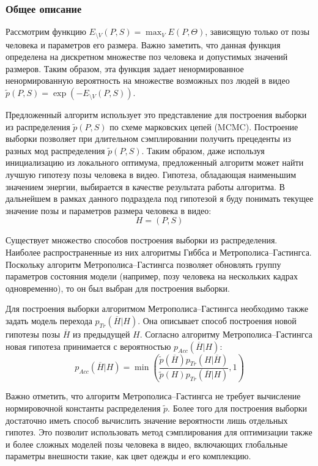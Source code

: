 \subsubsection{Общее описание}

Рассмотрим функцию $E_{\setminus V}(P, S) = \max_V{E(P, \Theta)}$, зависящую только от позы человека и параметров его размера. Важно заметить, что данная функция определена на дискретном множестве поз человека и допустимых значений размеров. Таким образом, эта функция задает ненормированное ненормированную вероятность на множестве возможных поз людей в видео $\tilde{p}(P, S) = \exp(-E_{\setminus V}(P, S))$. 

Предложенный алгоритм использует это представление для построения выборки из распределения $\tilde{p}(P, S)$ по схеме марковских цепей (MCMC). Построение выборки позволяет при длительном сэмплировании получить прецеденты из разных мод распределения $\tilde{p}(P, S)$. Таким образом, даже используя инициализацию из локального оптимума, предложенный алгоритм может найти лучшую гипотезу позы человека в видео. Гипотеза, обладающая наименьшим значением энергии, выбирается в качестве результата работы алгоритма. В дальнейшем в рамках данного подраздела под гипотезой я буду понимать текущее значение позы и параметров размера человека в видео:
\begin{equation}
	H = \left(P, S\right)
\end{equation}

Существует множество способов построения выборки из распределения. Наиболее распространенные из них алгоритмы Гиббса и Метрополиса--Гастингса. Поскольку алгоритм Метрополиса--Гастингса позволяет обновлять группу параметров состояния модели (например, позу человека на нескольких кадрах одновременно), то он был выбран для построения выборки.

Для построения выборки алгоритмом Метрополиса--Гастингса необходимо также задать модель перехода $p_{Tr}(\overline{H}|H)$. Она описывает способ построения новой гипотезы позы $\overline{H}$ из предыдущей $H$. Согласно алгоритму Метрополиса--Гастингса новая гипотеза принимается с вероятностью $p_{Acc}(\overline{H}|H)$:
\begin{equation}
p_{Acc}(\overline{H}|H) = \min{\left(\frac
	{\tilde{p}(\overline{H}) p_{Tr}(H|\overline{H})}
	{\tilde{p}(H) p_{Tr}(\overline{H}|H)}, 1\right)}
	\label{eq::MH_acc}
\end{equation}

Важно отметить, что алгоритм Метрополиса--Гастингса не требует вычисление нормировочной константы распределения $\tilde{p}$. Более того для построения выборки достаточно иметь способ вычислить значение вероятности лишь отдельных гипотез. Это позволит использовать метод сэмплирования для оптимизации также и более сложных моделей позы человека в видео, включающих глобальные параметры внешности такие, как цвет одежды и его комплекцию.

